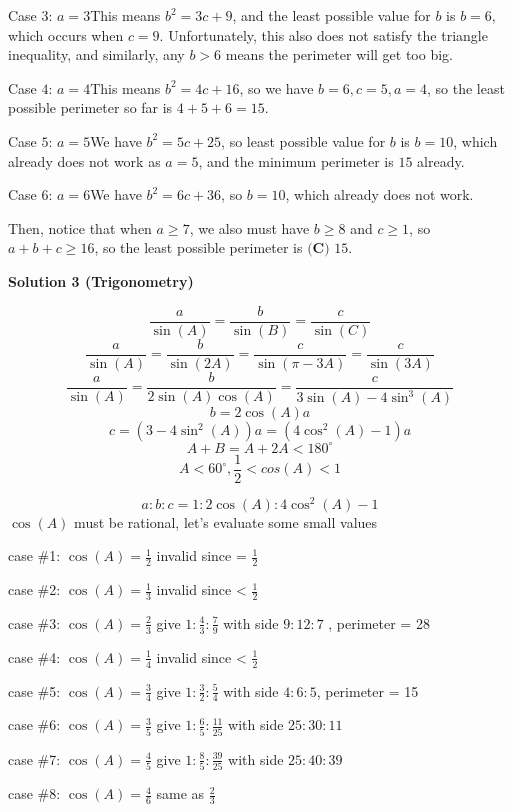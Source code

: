 \begin{enumerate}
 Case $3$: $a=3$This means $b^2=3c+9$, and the least possible value for $b$ is $b=6$, which occurs when $c=9$. Unfortunately, this also does not satisfy the triangle inequality, and similarly, any $b > 6$ means the perimeter will get too big.

 Case $4$: $a=4$This means $b^2=4c+16$, so we have $b=6,c=5,a=4$, so the least possible perimeter so far is $4+5+6=15$.

 Case $5$: $a=5$We have $b^2=5c+25$, so least possible value for $b$ is $b=10$, which already does not work as $a=5$, and the minimum perimeter is $15$ already.

 Case $6$: $a=6$We have $b^2=6c+36$, so $b=10$, which already does not work.

 Then, notice that when $a\geq 7$, we also must have $b\geq8$ and $c\geq1$, so $a+b+c \geq 16$, so the least possible perimeter is $\boxed{\textbf{(C) }15}.$




\textbf{Solution 3 (Trigonometry)}


 \[\frac{a}{\sin(A)} = \frac{b}{\sin(B)} = \frac{c}{\sin(C)}\]
 \[\frac{a}{\sin(A)} = \frac{b}{\sin(2A)} = \frac{c}{\sin(\pi- 3A)} = \frac{c}{\sin(3A)}\]
 \[\frac{a}{\sin(A)} = \frac{b}{2\sin(A)\cos(A)} = \frac{c}{3\sin(A) - 4\sin^3(A)}\]
 \[b = 2\cos(A)a\]
 \[c = (3 - 4\sin^2(A) ) a = (4\cos^2(A)-1)a\]
 \[A+B = A+2A < 180^{\circ}\]
 \[A < 60^{\circ} ,  \frac{1}{2} <  cos(A)  < 1\]

 \[a:b:c = 1: 2\cos(A) : 4\cos^2(A)-1\]$\cos(A)$ must be rational, let's evaluate some small values

 case \#1: $\cos(A) = \frac{1}{2}$ invalid since = $\frac{1}{2}$ 

 case \#2: $\cos(A) = \frac{1}{3}$ invalid since < $\frac{1}{2}$ 

 case \#3: $\cos(A) = \frac{2}{3}$ give ${1: \frac{4}{3} :  \frac{7}{9}  }$ with side $9:12:7$ , perimeter = 28 

 case \#4: $\cos(A) = \frac{1}{4}$ invalid since < $\frac{1}{2}$ 

 case \#5: $\cos(A) = \frac{3}{4}$ give ${1: \frac{3}{2} :  \frac{5}{4}  }$ with side $4:6:5$, perimeter = 15

 case \#6: $\cos(A) = \frac{3}{5}$ give ${1: \frac{6}{5} :  \frac{11}{25}  }$ with side $25:30:11$ 

 case \#7: $\cos(A) = \frac{4}{5}$ give ${1: \frac{8}{5} :  \frac{39}{25}  }$ with side $25:40:39$ 

 case \#8: $\cos(A) = \frac{4}{6}$ same as $\frac{2}{3}$


\end{enumerate}
